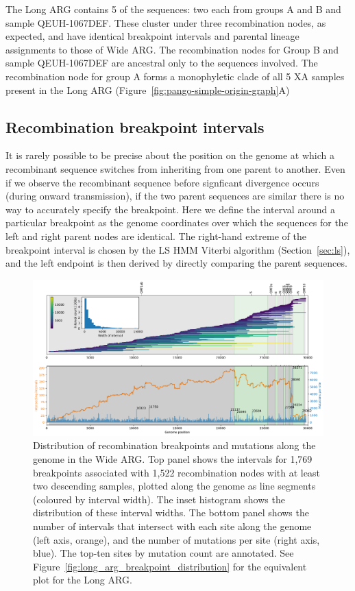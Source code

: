 \documentclass{article}
\begin{document}
The Long ARG contains 5 of the sequences: two each from groups A and B
and sample QEUH-1067DEF. These cluster under three recombination nodes, as expected,
and have identical breakpoint intervals and parental lineage assignments
to those of Wide ARG.
The recombination nodes for Group B and sample QEUH-1067DEF are ancestral only
to the sequences involved.
The recombination node for group A forms a monophyletic clade of all
5 XA samples present in the Long ARG
(Figure~\ref{fig:pango-simple-origin-graph}A)

\subsection{Recombination breakpoint intervals}
\label{sec:breakpoint_intervals}
It is rarely possible to be precise about the position on the genome at which
a recombinant sequence switches from inheriting from one parent to another.
Even if we observe the recombinant sequence before signficant
divergence occurs (during onward transmission), if the two parent sequences
are similar there is no way to
accurately specify the breakpoint.
Here we define the
interval around a particular breakpoint as the genome coordinates over which the
sequences for the left and right parent nodes are identical. The right-hand
extreme of the breakpoint interval is chosen by the LS HMM Viterbi algorithm
(Section~\ref{sec:ls}), and the left endpoint is then derived by directly
comparing the parent sequences.

\begin{figure}
\centering
\includegraphics[width=\textwidth]{figures/wide_arg_recombination_intervals.pdf}
\caption{\label{fig:breakpoint-distribution}
Distribution of recombination breakpoints and mutations along the genome in
the Wide ARG. Top panel shows the intervals for 1,769 breakpoints associated
with 1,522 recombination nodes with at least two descending samples, plotted along the genome
as line segments (coloured by interval width). The inset histogram shows the
distribution of these interval widths.
The bottom panel shows the number of intervals that intersect with
each site along the genome (left axis, orange), and the number of mutations
per site (right axis, blue).
The top-ten sites by mutation count are annotated.
See Figure~\ref{fig:long_arg_breakpoint_distribution} for the equivalent plot
for the Long ARG.}
\end{figure}
\end{document}
